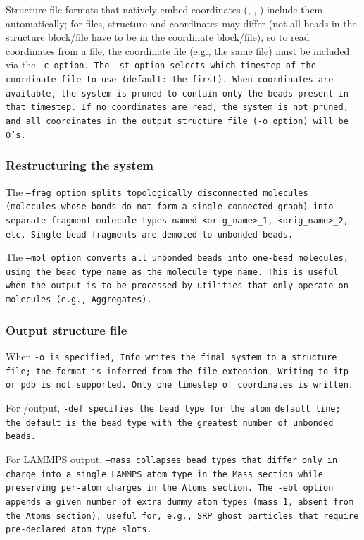 Structure file formats that natively embed coordinates (\data, \ltrj, \xyz)
include them automatically; for \vtf files, structure and coordinates may differ
(not all beads in the structure block/file have to be in the coordinate
block/file), so to read coordinates from a \vtf file, the coordinate file (e.g.,
the same \vtf file) must be included via the \tt{-c} option. The \tt{-st} option
selects which timestep of the coordinate file to use (default: the first). When
coordinates are available, the system is pruned to contain only the beads
present in that timestep. If no coordinates are read, the system is not pruned,
and all coordinates in the output structure file (\tt{-o} option) will be 0's.

\subsubsection*{Restructuring the system}

The \tt{--frag} option splits topologically disconnected molecules (molecules
whose bonds do not form a single connected graph) into separate fragment molecule
types named \tt{<orig_name>_1}, \tt{<orig_name>_2}, etc. Single-bead
fragments are demoted to unbonded beads.

The \tt{--mol} option converts all unbonded beads into one-bead molecules, using
the bead type name as the molecule type name. This is useful when the output is
to be processed by utilities that only operate on molecules (e.g.,
\tt{Aggregates}).

\subsubsection*{Output structure file}

When \tt{-o} is specified, \tt{Info} writes the final system to a structure
file; the format is inferred from the file extension. Writing to \tt{itp} or
\tt{pdb} is not supported. Only one timestep of coordinates is written.

For \vtf/\vsf output, \tt{-def} specifies the bead type for the
\tt{atom default} line; the default is the bead type with the greatest number of
unbonded beads.

For LAMMPS \data output, \tt{--mass} collapses bead types that differ only in
charge into a single LAMMPS atom type in the \tt{Mass} section while preserving
per-atom charges in the \tt{Atoms} section. The \tt{-ebt} option appends a given
number of extra dummy atom types (mass 1, absent from the \tt{Atoms} section),
useful for, e.g., SRP ghost particles that require pre-declared atom type slots.

